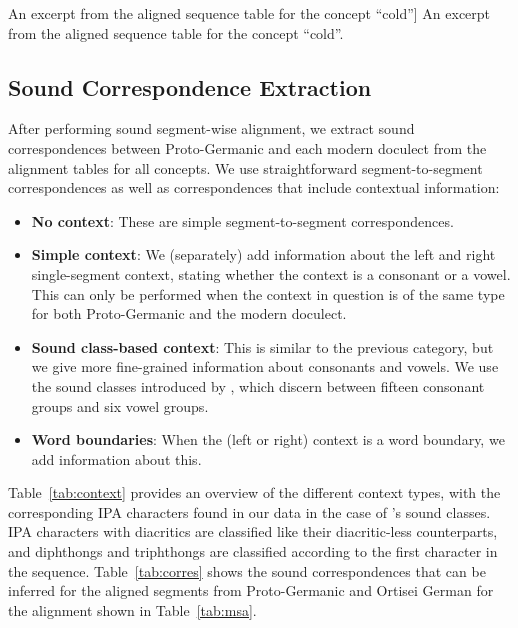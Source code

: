 \documentclass[a4paper]{article}
\begin{document}
\begin{table}[h]
\begin{center}

\end{center}
\caption
[An excerpt from the aligned sequence table for the concept ``cold'']
{An excerpt from the aligned sequence table for the concept ``cold''.}
\label{tab:msa}
\end{table}

\subsection{Sound Correspondence Extraction}
\label{subsec:corres}

After performing sound segment-wise alignment,
we extract sound correspondences between
Proto-Germanic and each modern doculect from the alignment tables for all concepts.
We use straightforward segment-to-segment correspondences
as well as correspondences that include contextual information:

\begin{itemize}
\item
\textbf{No context}:
These are simple segment-to-segment correspondences.

\item
\textbf{Simple context}:
We (separately) add information about the
left and right single-segment context,
stating whether the context is a consonant or a vowel. 
This can only be performed when the context in question is of
the same type for both Proto-Germanic and the modern doculect.

\item
\textbf{Sound class-based context}:
This is similar to the previous category,
but we give more fine-grained information about consonants and vowels.
We use the sound classes introduced by \citet{list2012sca},
which discern between fifteen consonant groups and six vowel groups.

\item
\textbf{Word boundaries}:
When the (left or right) context is a word boundary,
we add information about this.

\end{itemize}

Table~\ref{tab:context} provides an overview
of the different context types,
with the corresponding IPA characters found in our data
in the case of \citeauthor{list2012sca}'s sound classes.
IPA characters with diacritics are classified
like their diacritic-less counterparts,
and diphthongs and triphthongs are classified
according to the first character in the sequence.
Table~\ref{tab:corres} shows the sound correspondences
that can be inferred for the aligned segments
from Proto-Germanic and Ortisei German for the alignment
shown in Table~\ref{tab:msa}.
\end{document}
